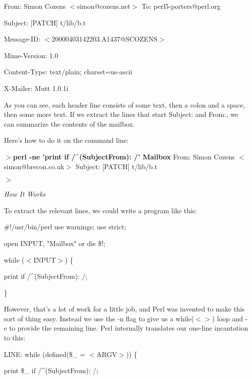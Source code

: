 \documentclass[a4paper,11pt]{book}
\begin{document}
\noindent From: Simon Cozens $<$simon@cozens.net$>$ To: perl5-porters@perl.org

\noindent Subject: [PATCH] t/lib/b.t

\noindent Message-ID: $<$20000403142203.A1437@SCOZENS$>$

\noindent Mime-Version: 1.0

\noindent Content-Type: text/plain; charset=us-ascii

\noindent X-Mailer: Mutt 1.0.1i

\noindent 

\noindent As you can see, each header line consists of some text, then a colon and a space, then some more text. If we extract the lines that start Subject: and From:, we can summarize the contents of the mailbox.

\noindent 

\noindent Here's how to do it on the command line:

\noindent 

\noindent $>$\textbf{perl -ne 'print if /\^{}(Subject\textbar From): /' Mailbox }From: Simon Cozens $<$simon@brecon.co.uk$>$ Subject: [PATCH] t/lib/b.t

\noindent $>$

\noindent 

\noindent 

\noindent \textit{How It Works}

\noindent To extract the relevant lines, we could write a program like this:

\noindent 

\noindent \#!/usr/bin/perl use warnings; use strict;

\noindent 

\noindent open INPUT, "Mailbox" or die \$!;

\noindent while ($<$INPUT$>$) \{

\noindent print if /\^{}(Subject\textbar From): /;

\noindent \}

\noindent 

\noindent However, that's a lot of work for a little job, and Perl was invented to make this sort of thing easy. Instead we use the -n flag to give us a while($<$$>$) loop and -e to provide the remaining line. Perl internally translates our one-line incantation to this:

\noindent 

\noindent LINE: while (defined(\$\_  = $<$ARGV$>$)) \{

\noindent print \$\_  if /\^{}(Subject\textbar From): /;
\end{document}
